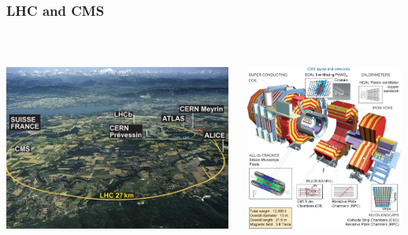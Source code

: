 \documentclass{beamer}
\begin{document}
\begin{frame}
 \frametitle{\Huge{LHC and CMS}}
 \begin{minipage}[t]{0.85\paperwidth}
  \begin{columns}
   \begin{column}{0.50\linewidth}
 \begin{tcolorbox}[colback=UNL@Cream!5,colframe=UNL@Cream!60,title=\textcolor{UMN@Maroon}{\textbf{\Large{LHC}}}]
    \includegraphics[height=7cm,width=0.99\textwidth]{THESISPLOTS/lhc-ring-aerial_2.jpg}
    \end{tcolorbox}
   \end{column}
   \begin{column}{0.50\linewidth}
   \begin{tcolorbox}[colback=UNL@Cream!5,colframe=UNL@Cream!60,title=\textcolor{UMN@Maroon}{\textbf{
   \Large{CMS Detector}}}]
    \includegraphics[height=7cm,width=0.99\textwidth]{THESISPLOTS/CMS_LAYOUT_AND_DETECTORS.jpg}
  \end{tcolorbox}
  \end{column}
 \end{columns}
 \end{minipage}
\end{frame}
\end{document}
